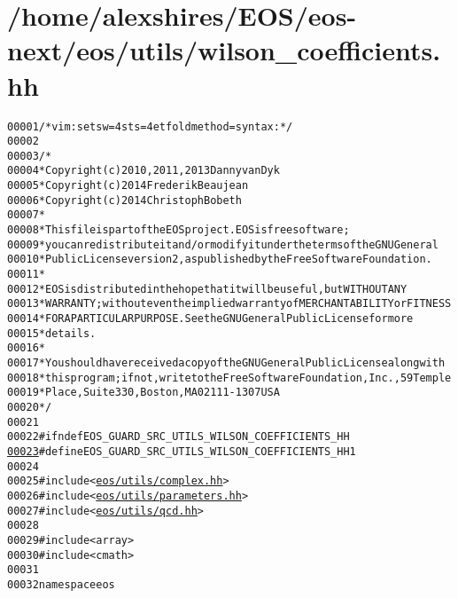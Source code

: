 \hypertarget{wilson__coefficients_8hh_source}{
\section{/home/alexshires/EOS/eos-\/next/eos/utils/wilson\_\-coefficients.hh}
}


\begin{footnotesize}\begin{alltt}
00001 \textcolor{comment}{/* vim: set sw=4 sts=4 et foldmethod=syntax : */}
00002 
00003 \textcolor{comment}{/*}
00004 \textcolor{comment}{ * Copyright (c) 2010, 2011, 2013 Danny van Dyk}
00005 \textcolor{comment}{ * Copyright (c) 2014 Frederik Beaujean}
00006 \textcolor{comment}{ * Copyright (c) 2014 Christoph Bobeth}
00007 \textcolor{comment}{ *}
00008 \textcolor{comment}{ * This file is part of the EOS project. EOS is free software;}
00009 \textcolor{comment}{ * you can redistribute it and/or modify it under the terms of the GNU General}
00010 \textcolor{comment}{ * Public License version 2, as published by the Free Software Foundation.}
00011 \textcolor{comment}{ *}
00012 \textcolor{comment}{ * EOS is distributed in the hope that it will be useful, but WITHOUT ANY}
00013 \textcolor{comment}{ * WARRANTY; without even the implied warranty of MERCHANTABILITY or FITNESS}
00014 \textcolor{comment}{ * FOR A PARTICULAR PURPOSE.  See the GNU General Public License for more}
00015 \textcolor{comment}{ * details.}
00016 \textcolor{comment}{ *}
00017 \textcolor{comment}{ * You should have received a copy of the GNU General Public License along with}
00018 \textcolor{comment}{ * this program; if not, write to the Free Software Foundation, Inc., 59 Temple}
00019 \textcolor{comment}{ * Place, Suite 330, Boston, MA  02111-1307  USA}
00020 \textcolor{comment}{ */}
00021 
00022 \textcolor{preprocessor}{#ifndef EOS\_GUARD\_SRC\_UTILS\_WILSON\_COEFFICIENTS\_HH}
\hypertarget{wilson__coefficients_8hh_source_l00023}{}\hyperlink{wilson__coefficients_8hh_a89af6a6c983929d07b250c7b823741b8}{00023} \textcolor{preprocessor}{}\textcolor{preprocessor}{#define EOS\_GUARD\_SRC\_UTILS\_WILSON\_COEFFICIENTS\_HH 1}
00024 \textcolor{preprocessor}{}
00025 \textcolor{preprocessor}{#include <\hyperlink{complex_8hh}{eos/utils/complex.hh}>}
00026 \textcolor{preprocessor}{#include <\hyperlink{parameters_8hh}{eos/utils/parameters.hh}>}
00027 \textcolor{preprocessor}{#include <\hyperlink{qcd_8hh}{eos/utils/qcd.hh}>}
00028 
00029 \textcolor{preprocessor}{#include <array>}
00030 \textcolor{preprocessor}{#include <cmath>}
00031 
00032 \textcolor{keyword}{namespace }eos

\end{alltt}
\end{footnotesize}
